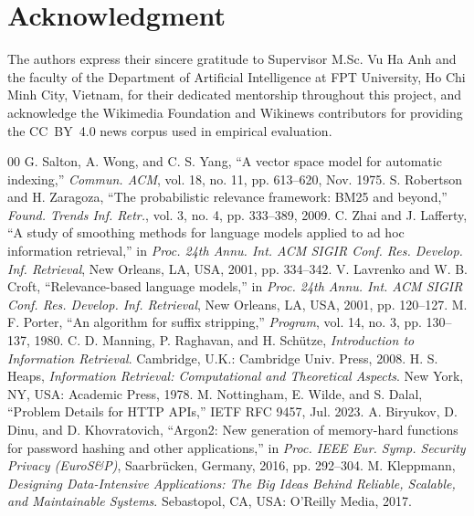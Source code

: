 \documentclass[conference]{IEEEtran}
\begin{document}
\section*{Acknowledgment}
The authors express their sincere gratitude to Supervisor M.Sc. Vu Ha Anh and the faculty of the Department of Artificial Intelligence at FPT University, Ho Chi Minh City, Vietnam, for their dedicated mentorship throughout this project, and acknowledge the Wikimedia Foundation and Wikinews contributors for providing the CC~BY~4.0 news corpus used in empirical evaluation.

\begin{thebibliography}{00}
 G. Salton, A. Wong, and C. S. Yang, ``A vector space model for automatic indexing,'' \textit{Commun. ACM}, vol. 18, no. 11, pp. 613--620, Nov. 1975.
 S. Robertson and H. Zaragoza, ``The probabilistic relevance framework: BM25 and beyond,'' \textit{Found. Trends Inf. Retr.}, vol. 3, no. 4, pp. 333--389, 2009.
 C. Zhai and J. Lafferty, ``A study of smoothing methods for language models applied to ad hoc information retrieval,'' in \textit{Proc. 24th Annu. Int. ACM SIGIR Conf. Res. Develop. Inf. Retrieval}, New Orleans, LA, USA, 2001, pp. 334--342.
 V. Lavrenko and W. B. Croft, ``Relevance-based language models,'' in \textit{Proc. 24th Annu. Int. ACM SIGIR Conf. Res. Develop. Inf. Retrieval}, New Orleans, LA, USA, 2001, pp. 120--127.
 M. F. Porter, ``An algorithm for suffix stripping,'' \textit{Program}, vol. 14, no. 3, pp. 130--137, 1980.
 C. D. Manning, P. Raghavan, and H. Sch{\"u}tze, \textit{Introduction to Information Retrieval}. Cambridge, U.K.: Cambridge Univ. Press, 2008.
 H. S. Heaps, \textit{Information Retrieval: Computational and Theoretical Aspects}. New York, NY, USA: Academic Press, 1978.
 M. Nottingham, E. Wilde, and S. Dalal, ``Problem Details for HTTP APIs,'' IETF RFC 9457, Jul. 2023.
 A. Biryukov, D. Dinu, and D. Khovratovich, ``Argon2: New generation of memory-hard functions for password hashing and other applications,'' in \textit{Proc. IEEE Eur. Symp. Security Privacy (EuroS\&P)}, Saarbr{\"u}cken, Germany, 2016, pp. 292--304.
 M. Kleppmann, \textit{Designing Data-Intensive Applications: The Big Ideas Behind Reliable, Scalable, and Maintainable Systems}. Sebastopol, CA, USA: O'Reilly Media, 2017.
\end{thebibliography}
\end{document}
